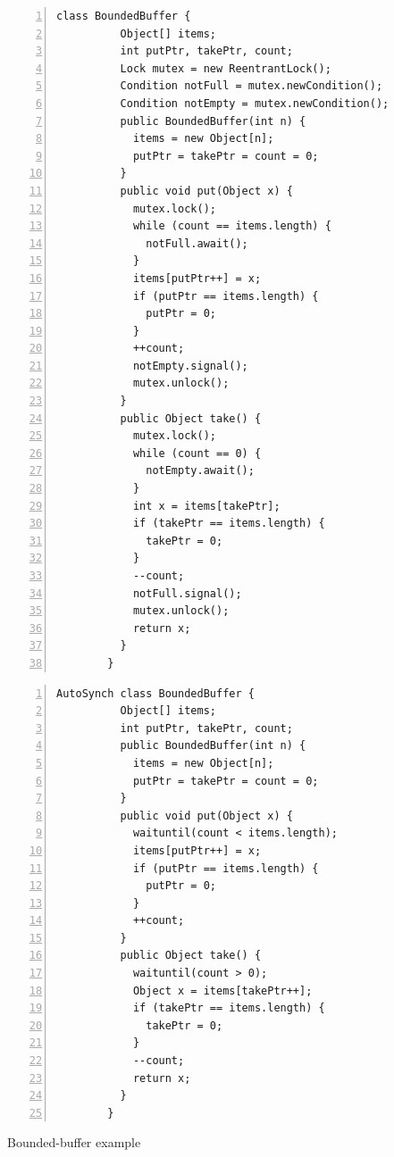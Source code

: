 \documentclass[preprint]{sigplanconf}
\begin{document}
\begin{figure}[ht!]
\begin{multicols}{2}
    \begin{Verbatim}[fontsize=\footnotesize,gobble=8,frame=topline,
            framesep=5mm,numbers=left,numbersep=2pt,
            label=\fbox{\small\emph{Explicit-Signal}}]
        class BoundedBuffer {
          Object[] items;  
          int putPtr, takePtr, count;
          Lock mutex = new ReentrantLock();
          Condition notFull = mutex.newCondition();
          Condition notEmpty = mutex.newCondition();
          public BoundedBuffer(int n) {
            items = new Object[n];
            putPtr = takePtr = count = 0;
          }
          public void put(Object x) {
            mutex.lock();
            while (count == items.length) {
              notFull.await();
            }
            items[putPtr++] = x;
            if (putPtr == items.length) {
              putPtr = 0;
            }
            ++count;
            notEmpty.signal();
            mutex.unlock();
          }
          public Object take() {
            mutex.lock();
            while (count == 0) {
              notEmpty.await();
            }
            int x = items[takePtr];
            if (takePtr == items.length) {
              takePtr = 0;
            }
            --count;
            notFull.signal();
            mutex.unlock();
            return x;
          }
        }
    \end{Verbatim}
    \begin{Verbatim}[fontsize=\footnotesize,gobble=8,frame=lines,framesep=5mm,
            numbers=left,numbersep=2pt,
            label=\fbox{\small\emph{Automatic-Signal}}]
        AutoSynch class BoundedBuffer { 
          Object[] items; 
          int putPtr, takePtr, count; 
          public BoundedBuffer(int n) {
            items = new Object[n];
            putPtr = takePtr = count = 0;
          }
          public void put(Object x) { 
            waituntil(count < items.length); 
            items[putPtr++] = x; 
            if (putPtr == items.length) { 
              putPtr = 0; 
            } 
            ++count; 
          } 
          public Object take() { 
            waituntil(count > 0); 
            Object x = items[takePtr++]; 
            if (takePtr == items.length) { 
              takePtr = 0; 
            }
            --count;
            return x;
          }
        }
    \end{Verbatim}
\end{multicols}
  \caption{Bounded-buffer example}
  \label{fig:bb_exp}
\end{figure}
\end{document}
